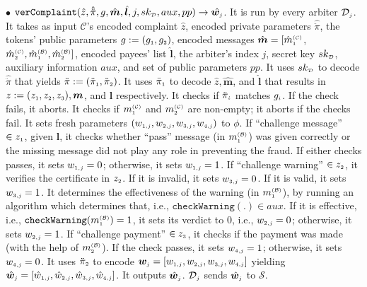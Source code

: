 \begin{definition}
\item  [$\bullet$] $\mathtt{verComplaint}( \hat z, \hat{\ddot{\pi}}, g, \hat{\bm m}, \hat{\bm{l}}, j, sk_{\scriptscriptstyle\mathcal D}, aux, pp)\rightarrow \hat{\bm{w}_{\scriptscriptstyle j}}$. It is run by every arbiter $\mathcal{D}_{\scriptscriptstyle  j}$. It takes as input  $\mathcal{C}$'s encoded complaint $\hat z$,  encoded private parameters $\hat{\ddot{\pi}}$,  the tokens' public parameters $g:=(g_{\scriptscriptstyle 1}, g_{\scriptscriptstyle 2})$,  encoded  messages $\hat{\bm m}=[\hat{m}_{\scriptscriptstyle 1}^{\scriptscriptstyle(\mathcal C)}$, $\hat{m}_{\scriptscriptstyle 2}^{\scriptscriptstyle(\mathcal C)}, \hat{m}_{\scriptscriptstyle 1}^{\scriptscriptstyle(\mathcal B)}, \hat{m}_{\scriptscriptstyle 2}^{\scriptscriptstyle(\mathcal B)}]$, encoded payees' list $ \hat{\bm{l}}$,  the  arbiter's index $j$, secret key $sk_{\scriptscriptstyle\mathcal D}$,   auxiliary information $aux$, and set of public parameters $pp$.  It uses $sk_{\scriptscriptstyle\mathcal D}$ to decode $\hat{\ddot{\pi}}$ that yields  $\ddot{\pi}:=(\ddot{\pi}_{\scriptscriptstyle 1}, \ddot{\pi}_{\scriptscriptstyle 2})$. It uses $\ddot{\pi}_{\scriptscriptstyle 1}$ to decode  $\hat z,  \hat{\bm{m}}$, and  $\hat{\bm{l}}$ that results in $z:=(z_{\scriptscriptstyle 1}, z_{\scriptscriptstyle 2}, z_{\scriptscriptstyle 3}), {\bm m}$, and  ${\bm{l}}$ respectively.  It checks if $\ddot{\pi}_{\scriptscriptstyle i}$ matches  $g_{\scriptscriptstyle i}$. If the check fails, it aborts.  It  checks  if ${m}_{\scriptscriptstyle 1}^{\scriptscriptstyle(\mathcal C)}$ and ${m}_{\scriptscriptstyle 2}^{\scriptscriptstyle(\mathcal C)}$ are non-empty; it aborts if the checks fail. It  sets  fresh parameters $(w_{\scriptscriptstyle 1,j}, w_{\scriptscriptstyle 2,j},  w_{\scriptscriptstyle 3,j},   w_{\scriptscriptstyle 4,j})$ to $\phi$. If ``challenge message'' $\in z_{\scriptscriptstyle 1}$, given $\bm l$,  it checks whether  ``pass''  message (in ${m}^{\scriptscriptstyle\mathcal{(B)}}_{\scriptscriptstyle1}$) was given correctly or the missing message did not play any role in preventing the fraud.  If either checks passes, it sets  $w_{\scriptscriptstyle 1,j}=0$;  otherwise,  it sets $w_{\scriptscriptstyle 1,j}=1$. If ``challenge warning'' $\in z_{\scriptscriptstyle 2}$,   it verifies  the certificate in $z_{\scriptscriptstyle 2}$.  If it is invalid,  it sets $ w_{\scriptscriptstyle 3,j}=0$.  If it is valid, it sets  $w_{\scriptscriptstyle 3,j}=1$. It  determines the effectiveness of the warning (in ${m}^{\scriptscriptstyle\mathcal{(B)}}_{\scriptscriptstyle1}$), by running an algorithm which  determines that, i.e., $\mathtt{checkWarning}(.)\in aux$. If  it is effective, i.e., $\mathtt{checkWarning}({m}^{\scriptscriptstyle\mathcal{(B)}}_{\scriptscriptstyle1})= 1$,  it sets its verdict to $0$, i.e., $w_{\scriptscriptstyle 2,j}=0$; otherwise, it sets $w_{\scriptscriptstyle 2,j}=1$.  If ``challenge payment'' $\in z_{\scriptscriptstyle 3}$,    it checks if the payment was made (with the help of ${m}_{\scriptscriptstyle 2}^{\scriptscriptstyle(\mathcal B)}$). If the check passes,  it sets $w_{\scriptscriptstyle 4,j}=1$; otherwise, it sets $w_{\scriptscriptstyle 4,j}=0$.  It uses $\ddot \pi_{\scriptscriptstyle 2}$ to encode  $\bm{w}_{\scriptscriptstyle j} = [w_{\scriptscriptstyle 1,j}, w_{\scriptscriptstyle 2, j}, w_{\scriptscriptstyle 3, j}, w_{\scriptscriptstyle 4, j}]$ yielding  $\hat{\bm{w}}_{\scriptscriptstyle j}= [\hat {w}_{\scriptscriptstyle 1,j}, \hat{w}_{\scriptscriptstyle 2, j}, \hat{w}_{\scriptscriptstyle 3, j}, \hat{w}_{\scriptscriptstyle 4, j}]$. It outputs $\hat{\bm{w}}_{\scriptscriptstyle j}$. $\mathcal{D}_{\scriptscriptstyle  j}$ sends $\hat{\bm{w}}_{\scriptscriptstyle j}$ to  $\mathcal{S}$. 
%


\end{definition}
